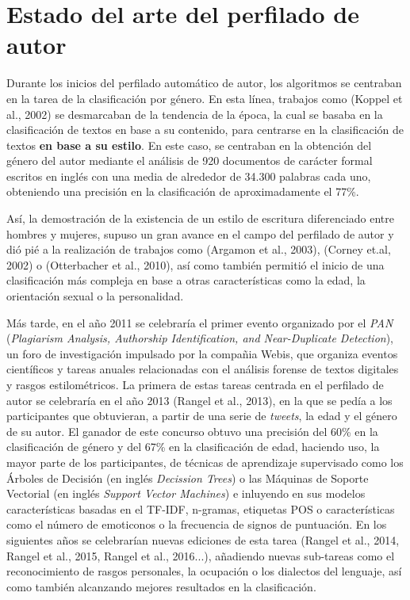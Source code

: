 \chapter{Estado del arte del perfilado de autor}
\label{chap:estadoarte}

Durante los inicios del perfilado automático de autor, los algoritmos se centraban en la tarea de la clasificación por género.
En esta línea, trabajos como (Koppel et al., 2002)\cite{koppel2002automatically} se desmarcaban de la tendencia de la época,
la cual se basaba en la clasificación de textos en base a su contenido, para centrarse en la clasificación de textos \textbf{en base a su estilo}. En este caso, se centraban en la obtención del género del autor mediante el análisis
de 920 documentos de carácter formal escritos en inglés con una media de alrededor de 34.300 palabras cada uno, obteniendo una precisión en la clasificación de
aproximadamente el 77\%.

\bigskip
Así, la demostración de la existencia de un estilo de escritura diferenciado entre hombres y mujeres, supuso un gran avance en el campo del perfilado de autor
y dió pié a la realización de trabajos como (Argamon et al., 2003)\cite{argamon2003gender}, (Corney et.al, 2002)\cite{corney2002gender} o (Otterbacher et al., 2010)\cite{otterbacher2010inferring}, 
así como también permitió el inicio de una clasificación más compleja en base a otras características como la edad, la orientación sexual o la personalidad.

\bigskip
Más tarde, en el año 2011 se celebraría el primer evento organizado por el \textit{PAN} (\textit{Plagiarism Analysis, Authorship Identification, and Near-Duplicate Detection}),
un foro de investigación impulsado por la compañia Webis, que organiza eventos científicos y tareas anuales relacionadas con el análisis forense de textos digitales
y rasgos estilométricos. La primera de estas tareas centrada en el perfilado de autor se celebraría en el año 2013 (Rangel et al., 2013)\cite{rangel2013overview},
en la que se pedía a los participantes que obtuvieran, a partir de una serie de \textit{tweets}, la edad y el género de su autor. El ganador de este concurso obtuvo una
precisión del 60\% en la clasificación de género y del 67\% en la clasificación de edad, haciendo uso, la mayor parte de los participantes, de técnicas de aprendizaje
supervisado como los Árboles de Decisión (en inglés \textit{Decission Trees}) o las Máquinas de Soporte Vectorial (en inglés \textit{Support Vector Machines}) e inluyendo
en sus modelos características basadas en el TF-IDF, n-gramas, etiquetas POS o características como el número de emoticonos o la frecuencia de signos de puntuación.
En los siguientes años se celebrarían nuevas ediciones de esta tarea (Rangel et al., 2014\cite{rangel2014overview}, Rangel et al., 2015\cite{rangel2015overview},
Rangel et al., 2016\cite{rangel2016overview}...), añadiendo nuevas sub-tareas como el reconocimiento de rasgos personales, la ocupación o los dialectos del lenguaje,
así como también alcanzando mejores resultados en la clasificación.

